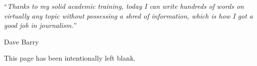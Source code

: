 

\vspace*{0.2\textheight}

\noindent\enquote{\itshape Thanks to my solid academic training, today I can write hundreds of words on virtually any topic without possessing a shred of information, which is how I got a good job in journalism.}\bigbreak

\hfill Dave Barry

\newpage

\vfill This page has been intentionally left blank.